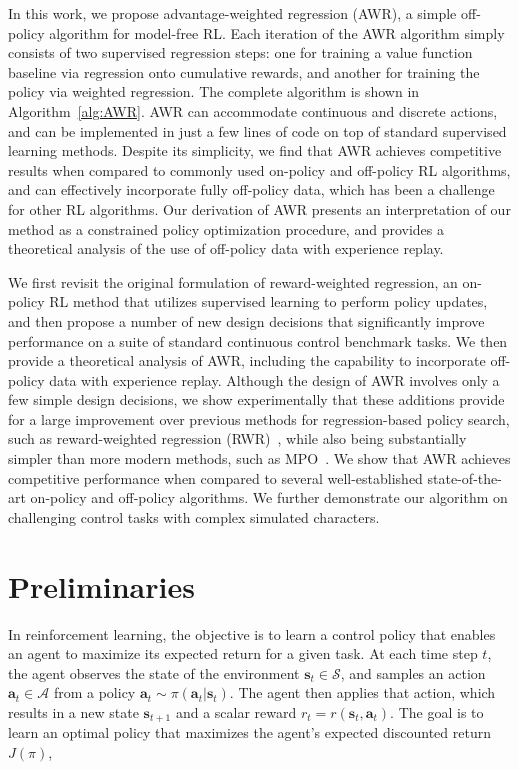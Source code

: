 In this work, we propose advantage-weighted regression (AWR), a simple off-policy algorithm for model-free RL. Each iteration of the AWR algorithm simply consists of two supervised regression steps: one for training a value function baseline via regression onto cumulative rewards, and another for training the policy via weighted regression. The complete algorithm is shown in Algorithm~\ref{alg:AWR}. AWR can accommodate continuous and discrete actions, and can be implemented in just a few lines of code on top of standard supervised learning methods. Despite its simplicity, we find that AWR achieves competitive results when compared to commonly used on-policy and off-policy RL algorithms, and can effectively incorporate fully off-policy data, which has been a challenge for other RL algorithms. Our derivation of AWR presents an interpretation of our method as a constrained policy optimization procedure, and provides a theoretical analysis of the use of off-policy data with experience replay.

We first revisit the original formulation of reward-weighted regression, an on-policy RL method that utilizes supervised learning to perform policy updates, and then propose a number of new design decisions that significantly improve performance on a suite of standard continuous control benchmark tasks. We then provide a theoretical analysis of AWR, including the capability to incorporate off-policy data with experience replay. Although the design of AWR involves only a few simple design decisions, we show experimentally that these additions provide for a large improvement over previous methods for regression-based policy search, such as reward-weighted regression (RWR)~\citep{Peters2007RWR}, while also being substantially simpler than more modern methods, such as MPO~\citep{abdolmaleki2018maximum}. We show that AWR achieves competitive performance when compared to several well-established state-of-the-art on-policy and off-policy algorithms. We further demonstrate our algorithm on challenging control tasks with complex simulated characters.

\section{Preliminaries}

In reinforcement learning, the objective is to learn a control policy that enables an agent to maximize its expected return for a given task. At each time step $t$, the agent observes the state of the environment ${\mathbf{s}}_t \in \mathcal{S}$, and samples an action ${\mathbf{a}}_t \in \mathcal{A}$ from a policy ${\mathbf{a}}_t \sim \pi({\mathbf{a}}_t|{\mathbf{s}}_t)$. The agent then applies that action, which results in a new state ${\mathbf{s}}_{t+1}$ and a scalar reward $r_t = r({\mathbf{s}}_t, {\mathbf{a}}_t)$. The goal is to learn an optimal policy that maximizes the agent's expected discounted return $J(\pi)$,

